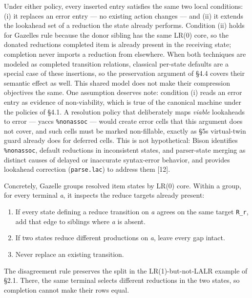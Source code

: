 \documentclass[
  10pt,
]{article}
\providecommand{\tightlist}{%
  \setlength{\itemsep}{0pt}\setlength{\parskip}{0pt}}
\begin{document}
Under either policy, every inserted entry satisfies the same two local
conditions: (i) it replaces an error entry --- no existing action
changes --- and (ii) it extends the lookahead set of a reduction the
state already performs. Condition (ii) holds for
Gazelle\textquotesingle s rule because the donor sibling has the same
LR(0) core, so the donated reduction\textquotesingle s completed item is
already present in the receiving state; completion never imports a
reduction from elsewhere. When both techniques are modeled as completed
transition relations, classical per-state defaults are a special case
of these insertions, so the preservation argument of §4.4 covers their
semantic effect as well. This shared model does not make their
compression objectives the same. One assumption deserves note: condition (i) reads
an error entry as evidence of non-viability, which is true of the
canonical machine under the policies of §4.1. A resolution policy that
deliberately maps \emph{viable} lookaheads to error ---
yacc\textquotesingle s \texttt{\%nonassoc} --- would create error cells
that this argument does not cover, and such cells must be marked
non-fillable, exactly as §5\textquotesingle s virtual-twin guard already
does for deferred cells. This is not hypothetical: Bison identifies
\texttt{\%nonassoc}, default reductions in inconsistent states, and
parser-state merging as distinct causes of delayed or inaccurate
syntax-error behavior, and provides lookahead correction
(\texttt{parse.lac}) to address them {[}12{]}.

Concretely, Gazelle groups resolved item states by LR(0) core. Within a
group, for every terminal \emph{a}, it inspects the reduce targets
already present:

\begin{enumerate}
\def\labelenumi{\arabic{enumi}.}
\tightlist
\item
  If every state defining a reduce transition on \emph{a} agrees on the
  same target \texttt{R\_r}, add that edge to siblings where \emph{a} is
  absent.
\item
  If two states reduce different productions on \emph{a}, leave every
  gap intact.
\item
  Never replace an existing transition.
\end{enumerate}

The disagreement rule preserves the split in the LR(1)-but-not-LALR
example of §2.1. There, the same terminal selects different reductions
in the two states, so completion cannot make their rows equal.
\end{document}
